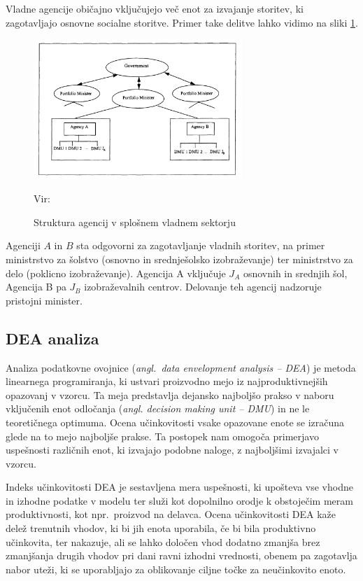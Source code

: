 \documentclass[12pt,a4paper]{article}
\theoremstyle{definition}
\begin{document}
Vladne agencije običajno vključujejo več enot za izvajanje 
storitev, ki zagotavljajo osnovne socialne storitve. 
Primer take delitve lahko vidimo na sliki 
\ref{fig:government_structure}.


\begin{figure}[htbp]
    \centering
    \includegraphics[width=0.7\textwidth]{government_structure.png}
    \caption{Struktura agencij v splošnem vladnem sektorju}
    \label{fig:government_structure}
    \vspace{0.2em}
    \footnotesize{Vir: \cite{Lovell2002}}
\end{figure}

Agenciji $A$ in $B$ sta odgovorni za zagotavljanje vladnih storitev, 
na primer ministrstvo za šolstvo (osnovno in srednješolsko 
izobraževanje) ter ministrstvo za delo (poklicno izobraževanje).
Agencija A vključuje $J_A$ osnovnih in srednjih šol, Agencija B 
pa $J_B$ izobraževalnih centrov. Delovanje teh agencij nadzoruje
pristojni minister. \cite{Yaisawarng2002}

\subsection{DEA analiza}

Analiza podatkovne ovojnice (\emph{angl.\ data envelopment analysis -- DEA}) je 
metoda linearnega programiranja, ki ustvari proizvodno mejo iz 
najproduktivnejših opazovanj v vzorcu. Ta meja predstavlja 
dejansko najboljšo prakso v naboru vključenih enot odločanja
(\emph{angl. decision making unit -- DMU}) in ne le teoretičnega optimuma. Ocena učinkovitosti 
vsake opazovane enote se izračuna glede na to mejo najboljše 
prakse. Ta postopek nam omogoča primerjavo uspešnosti različnih
enot, ki izvajajo podobne naloge, z najboljšimi izvajalci
v vzorcu. \cite{Yaisawarng2002}

Indeks učinkovitosti DEA je sestavljena mera uspešnosti,
ki upošteva vse vhodne in izhodne podatke v modelu ter služi
kot dopolnilno orodje k obstoječim meram produktivnosti,
kot npr.\ proizvod na delavca. Ocena učinkovitosti DEA
kaže delež trenutnih vhodov, ki
bi jih enota uporabila, če bi bila produktivno učinkovita,
ter nakazuje, ali se lahko določen vhod dodatno zmanjša brez
zmanjšanja drugih vhodov pri dani ravni izhodni vrednosti,
obenem pa zagotavlja nabor uteži, ki se uporabljajo za
oblikovanje ciljne točke za neučinkovito enoto. \cite{Yaisawarng2002}
\end{document}
